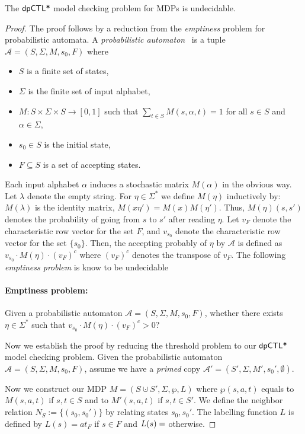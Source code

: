 \begin{theorem}
The $\textsf{dpCTL*}$ model checking problem for MDPs  is undecidable.
\end{theorem}
\begin{proof}
The proof follows by a reduction from the \emph{emptiness} problem for probabilistic automata.
A \emph{probabilistic automaton}~\cite{Rabin63} is a tuple $\mathcal{A}= (S,\Sigma,M,s_0,F)$ where
\begin{itemize}
  \item $S$ is a finite set of states,
  \item $\Sigma$ is the finite set of input alphabet,
  \item $M: S\times\Sigma\times S \to [0,1]$ such that $\sum_{t\in S} M(s,\alpha,t)=1$ for all $s\in S$ and $\alpha\in \Sigma$,
  \item $s_0\in S$ is the initial state,
  \item $F\subseteq S$ is a set of accepting states.
\end{itemize}

Each input alphabet $\alpha$ induces a stochastic matrix $M(\alpha)$ in the obvious way. Let $\lambda$ denote the empty string. For $\eta\in\Sigma^*$ we define $M(\eta)$ inductively by: $M(\lambda)$ is the identity matrix, $M(x\eta')=M(x)M(\eta')$. Thus, $M(\eta)(s,s')$ denotes the probability of going from $s$ to $s'$ after reading $\eta$. Let $v_F$ denote the characteristic row vector for the set $F$, and $v_{s_0}$ denote the characteristic row vector for the set $\{s_0\}$. Then, the accepting probably of $\eta$ by $\mathcal{A}$ is defined as $v_{s_0}\cdot M(\eta)\cdot (v_F)^c$ where $(v_F)^c$ denotes the transpose of $v_F$. The following \emph{emptiness problem} is know to be undecidable~\cite{Paz71}

\paragraph{Emptiness problem:} Given a probabilistic automaton $\mathcal{A}= (S,\Sigma,M,s_0,F)$, whether there exists $\eta\in\Sigma^*$ such that $v_{s_0}\cdot M(\eta)\cdot (v_F)^c > 0$?

Now we establish the proof by reducing the threshold problem to our $\textsf{dpCTL*}$ model checking problem. Given the probabilistic automaton  $\mathcal{A}= (S,\Sigma,M,s_0,F)$, assume we have a \emph{primed} copy $\mathcal{A}'= (S',\Sigma,M',s_0',\emptyset)$.

Now we construct our MDP  $M =
(S\cupdot S', \Sigma, \wp, L)$ where $\wp(s,a,t)$ equals to $M(s,a,t)$ if $s,t\in S$ and to $M'(s,a,t)$ if $s,t\in S'$. We define the neighbor relation $N_S:=\{(s_0,s_0')\}$ by relating states $s_0,s_0'$. The labelling function $L$ is defined by $L(s)=at_F$ if $s\in F$ and $L(s)=\empty$ otherwise.


\end{proof}
